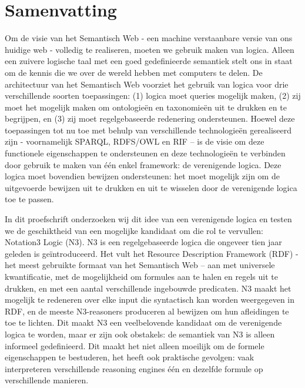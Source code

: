 \chapter{Samenvatting}\label{dutch-summary}


Om de visie van het Semantisch Web - een machine verstaanbare versie van ons huidige web - volledig
te realiseren, moeten we gebruik maken van logica. Alleen een zuivere logische taal met een goed
gedefinieerde semantiek stelt ons in staat om de kennis die we over de wereld hebben met
computers te delen. De architectuur van het Semantisch Web voorziet het gebruik van logica voor drie
verschillende soorten toepassingen: (1) logica moet queries mogelijk maken, (2) zij moet het mogelijk
maken om ontologieën en taxonomieën uit te drukken en te begrijpen, en (3) zij moet regelgebaseerde redenering ondersteunen. 
Hoewel deze toepassingen tot nu toe met
behulp van verschillende technologieën gerealiseerd zijn - voornamelijk SPARQL, RDFS/OWL en RIF
– is de visie om deze functionele eigenschappen te ondersteunen en deze technologieën te verbinden
door gebruik te maken van één enkel framework: de verenigende logica. Deze logica moet bovendien
 bewijzen ondersteunen: het moet mogelijk zijn om de uitgevoerde bewijzen uit te
drukken en uit te wisselen door de verenigende logica toe te passen.

In dit proefschrift onderzoeken wij dit idee van een verenigende logica en testen we de geschiktheid
van een mogelijke kandidaat om die rol te vervullen: Notation3 Logic (N3). N3 is een regelgebaseerde
logica die ongeveer tien jaar geleden is geïntroduceerd. Het vult het Resource Description
Framework (RDF) - het meest gebruikte formaat van het Semantisch Web – aan met universele
kwantificatie, met de mogelijkheid om formules aan te halen en regels uit te drukken, en met een
aantal verschillende ingebouwde predicaten. N3 maakt het mogelijk te redeneren over elke input die
syntactisch kan worden weergegeven in RDF, en de meeste N3-reasoners produceren al bewijzen om
hun afleidingen te toe te lichten. Dit maakt N3 een veelbelovende kandidaat om de verenigende
logica te worden, maar er zijn ook obstakels: de semantiek van N3 is alleen informeel gedefinieerd.
Dit maakt het niet alleen moeilijk om de formele eigenschappen te bestuderen, het heeft ook
praktische gevolgen: vaak interpreteren verschillende reasoning engines één en dezelfde formule op
verschillende manieren.

